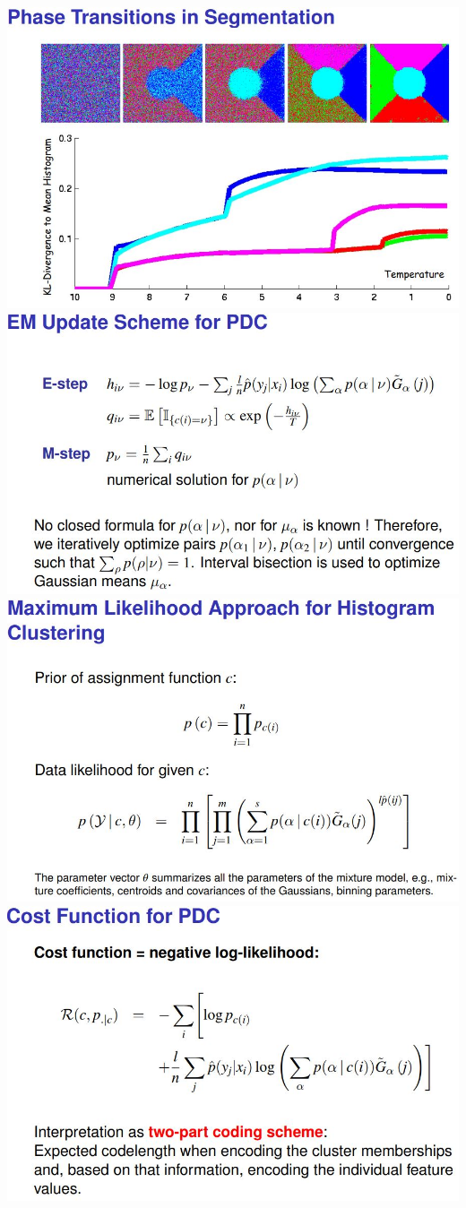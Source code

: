 \documentclass[9pt,parskip]{scrartcl}
\begin{document}
\begin{multicols*}{4}
\begin{center}
\includegraphics[width=0.8\linewidth]{pictures/phaseTransitions.jpg}
\includegraphics[width=0.8\linewidth]{pictures/EMschemePDC.jpg}
\includegraphics[width=0.8\linewidth]{pictures/MLforHC.jpg}
\includegraphics[width=0.8\linewidth]{pictures/CostFunctionPDC.jpg}

\end{center}
\end{multicols*}
\end{document}
